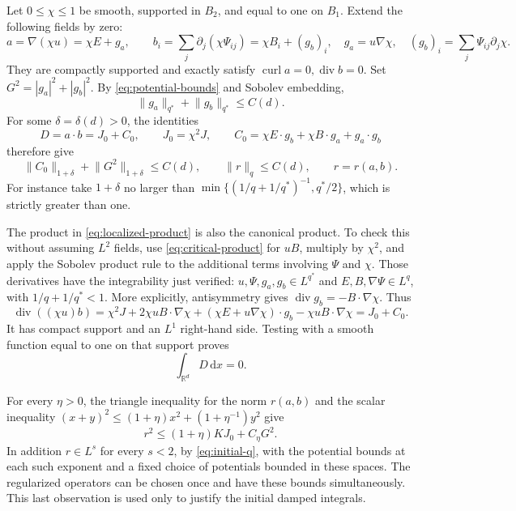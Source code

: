 \documentclass[11pt,a4paper]{article}
\numberwithin{equation}{section}
\theoremstyle{definition}
\theoremstyle{remark}\newtheorem{remark}[theorem]{Remark}
\DeclareMathOperator{\diver}{div}
\DeclareMathOperator{\curl}{curl}
\newcommand{\R}{\mathbb R}
\newcommand{\dd}{\,\mathrm dx}
\newcommand{\norm}[1]{\lVert #1\rVert}
\begin{document}
Let \(0\leq\chi\leq1\) be smooth, supported in \(B_2\), and equal
to one on \(B_1\). Extend the following fields by zero:
\[
 a=\nabla(\chi u)=\chi E+g_a,\qquad
 b_i=\sum_j\partial_j(\chi\Psi_{ij})=\chi B_i+(g_b)_i,
 \quad
 g_a=u\nabla\chi,\quad (g_b)_i=\sum_j\Psi_{ij}\partial_j\chi.
\]
They are compactly supported and exactly satisfy
\(\curl a=0,\diver b=0\).
Set \(G^2=|g_a|^2+|g_b|^2\).
By \eqref{eq:potential-bounds} and Sobolev embedding,
\[
 \norm{g_a}_{q^*}+\norm{g_b}_{q^*}\leq C(d).
\]
For some \(\delta=\delta(d)>0\), the identities
\begin{equation}\label{eq:localized-product}
 D=a\cdot b=J_0+C_0,\qquad J_0=\chi^2J,\qquad
 C_0=\chi E\cdot g_b+\chi B\cdot g_a+g_a\cdot g_b
\end{equation}
therefore give
\begin{equation}\label{eq:cutoff-control}
 \norm{C_0}_{1+\delta}+\norm{G^2}_{1+\delta}\leq C(d),
 \qquad \norm r_q\leq C(d),\qquad r=r(a,b).
\end{equation}
For instance take \(1+\delta\) no larger than
\(\min\{(1/q+1/q^*)^{-1},q^*/2\}\), which is strictly greater than one.

The product in \eqref{eq:localized-product} is also the canonical
product. To check this without assuming \(L^2\) fields, use
\eqref{eq:critical-product} for \(uB\), multiply by \(\chi^2\), and
apply the Sobolev product rule to the additional terms involving
\(\Psi\) and \(\chi\). Those derivatives have the integrability just
verified: \(u,\Psi,g_a,g_b\in L^{q^*}\) and
\(E,B,\nabla\Psi\in L^q\), with \(1/q+1/q^*<1\).
More explicitly, antisymmetry gives
\(\diver g_b=-B\cdot\nabla\chi\). Thus
\[
 \diver((\chi u)b)=
 \chi^2J+2\chi uB\cdot\nabla\chi+
 (\chi E+u\nabla\chi)\cdot g_b-\chi uB\cdot\nabla\chi
 =J_0+C_0.
\]
It has compact support and an \(L^1\) right-hand side. Testing with
a smooth function equal to one on that support proves
\begin{equation}\label{eq:zero-local-product}
 \int_{\R^d}D\dd=0.
\end{equation}

For every \(\eta>0\), the triangle inequality for the norm \(r(a,b)\)
and the scalar inequality \((x+y)^2\leq(1+\eta)x^2+(1+\eta^{-1})y^2\)
give
\begin{equation}\label{eq:localized-distortion}
 r^2\leq(1+\eta)KJ_0+C_\eta G^2.
\end{equation}
In addition \(r\in L^s\) for every \(s<2\), by
\eqref{eq:initial-q}, with the potential bounds at each such exponent
and a fixed choice of potentials bounded in these spaces.
The regularized operators can be chosen once and have these bounds
simultaneously. This last observation is used only to justify the
initial damped integrals.
\end{document}
